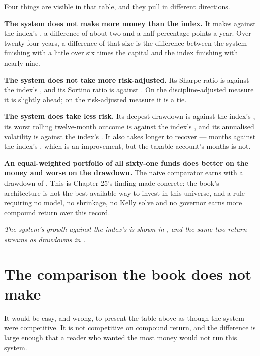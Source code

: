 Four things are visible in that table, and they pull in different
directions.

\textbf{The system does not make more money than the index.} It makes
\numFullCAGR{} against the index's \numSpyCAGR{}, a difference of about
two and a half percentage points a year. Over twenty-four years, a
difference of that size is the difference between the system finishing
with a little over six times the capital and the index finishing with
nearly nine.

\textbf{The system does not take more risk-adjusted.} Its Sharpe ratio is
\numFullSharpe{} against the index's \numSpySharpe{}, and its Sortino
ratio is \numFullSortino{} against \numSpySortino{}. On the
discipline-adjusted measure it is slightly ahead; on the risk-adjusted
measure it is a tie.

\textbf{The system does take less risk.} Its deepest drawdown is
\numFullDD{} against the index's \numSpyDD{}, its worst rolling
twelve-month outcome is \numFullWorstYear{} against the index's \numSpyWorstYear{}, and
its annualised volatility is \numFullVol{} against the index's
\numSpyVol{}. It also takes longer to recover --- \numFullRecovery{} months
against the index's \numSpyRecovery{}, which is an improvement, but the
taxable account's \numTaxRecovery{} months is not.

\textbf{An equal-weighted portfolio of all sixty-one funds does better on
the money and worse on the drawdown.} The naive comparator earns
\numEqualCAGR{} with a drawdown of \numEqualDD{}. This is Chapter 25's
finding made concrete: the book's architecture is not the best available
way to invest in this universe, and a rule requiring no model, no
shrinkage, no Kelly solve and no governor earns more compound return over
this record.

\begin{center}\emph{The system's growth against the index's is shown in , and the same two return streams as drawdowns in .}\end{center}

\section{The comparison the book does not make}

It would be easy, and wrong, to present the table above as though the
system were competitive. It is not competitive on compound return, and
the difference is large enough that a reader who wanted the most money
would not run this system.

